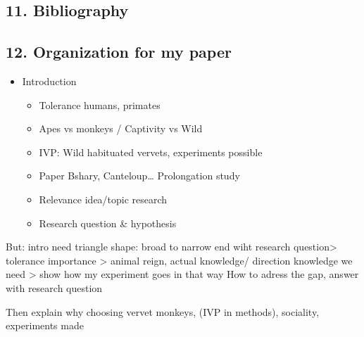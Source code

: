 \documentclass[
]{article}
\providecommand{\tightlist}{%
  \setlength{\itemsep}{0pt}\setlength{\parskip}{0pt}}
\begin{document}
\hypertarget{bibliography}{%
\subsection{11. Bibliography}\label{bibliography}}

\hypertarget{organization-for-my-paper}{%
\subsection{12. Organization for my
paper}\label{organization-for-my-paper}}

\begin{itemize}
\tightlist
\item
  Introduction

  \begin{itemize}
  \tightlist
  \item
    Tolerance humans, primates
  \item
    Apes vs monkeys / Captivity vs Wild
  \item
    IVP: Wild habituated vervets, experiments possible
  \item
    Paper Bshary, Canteloup\ldots{} Prolongation study
  \item
    Relevance idea/topic research
  \item
    Research question \& hypothesis
  \end{itemize}
\end{itemize}

But: intro need triangle shape: broad to narrow end wiht research
question\textgreater{} tolerance importance \textgreater{} animal reign,
actual knowledge/ direction knowledge we need \textgreater{} show how my
experiment goes in that way How to adress the gap, answer with research
question

Then explain why choosing vervet monkeys, (IVP in methods), sociality,
experiments made
\end{document}
